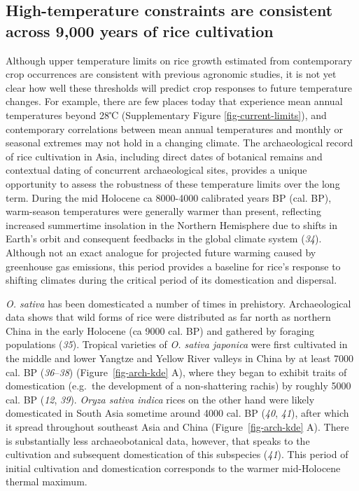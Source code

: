 \documentclass[
  letterpaper,
  DIV=11,
  numbers=noendperiod]{scrartcl}
\begin{document}
\subsection{High-temperature constraints are consistent across 9,000
years of rice
cultivation}\label{high-temperature-constraints-are-consistent-across-9000-years-of-rice-cultivation}

Although upper temperature limits on rice growth estimated from
contemporary crop occurrences are consistent with previous agronomic
studies, it is not yet clear how well these thresholds will predict crop
responses to future temperature changes. For example, there are few
places today that experience mean annual temperatures beyond 28℃
(Supplementary Figure \ref{fig-current-limits}), and contemporary
correlations between mean annual temperatures and monthly or seasonal
extremes may not hold in a changing climate. The archaeological record
of rice cultivation in Asia, including direct dates of botanical remains
and contextual dating of concurrent archaeological sites, provides a
unique opportunity to assess the robustness of these temperature limits
over the long term. During the mid Holocene ca 8000-4000 calibrated
years BP (cal. BP), warm-season temperatures were generally warmer than
present, reflecting increased summertime insolation in the Northern
Hemisphere due to shifts in Earth's orbit and consequent feedbacks in
the global climate system (\emph{34}). Although not an exact analogue
for projected future warming caused by greenhouse gas emissions, this
period provides a baseline for rice's response to shifting climates
during the critical period of its domestication and dispersal.

\emph{O. sativa} has been domesticated a number of times in prehistory.
Archaeological data shows that wild forms of rice were distributed as
far north as northern China in the early Holocene (ca 9000 cal. BP) and
gathered by foraging populations (\emph{35}). Tropical varieties of
\emph{O. sativa japonica} were first cultivated in the middle and lower
Yangtze and Yellow River valleys in China by at least 7000 cal. BP
(\emph{36}--\emph{38}) (Figure~\ref{fig-arch-kde} A), where they began
to exhibit traits of domestication (e.g.~the development of a
non-shattering rachis) by roughly 5000 cal. BP (\emph{12}, \emph{39}).
\emph{Oryza sativa indica} rices on the other hand were likely
domesticated in South Asia sometime around 4000 cal. BP (\emph{40},
\emph{41}), after which it spread throughout southeast Asia and China
(Figure~\ref{fig-arch-kde} A). There is substantially less
archaeobotanical data, however, that speaks to the cultivation and
subsequent domestication of this subspecies (\emph{41}). This period of
initial cultivation and domestication corresponds to the warmer
mid-Holocene thermal maximum.
\end{document}
